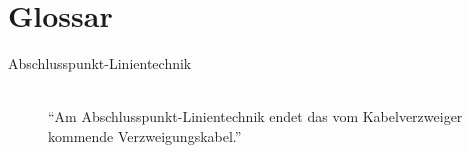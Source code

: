 %
%

\chapter{Glossar}

\begin{description}
    \item [Abschlusspunkt-Linientechnik] \hfill \\
        \enquote{Am Abschlusspunkt-Linientechnik endet das vom Kabelverzweiger kommende Verzweigungskabel.} \cite{bib:vodafone-legt-in-pirmasens}

\end{description}

